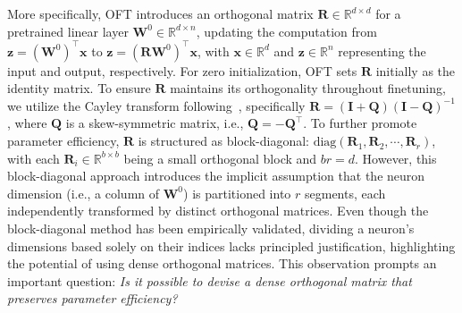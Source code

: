More specifically, OFT introduces an orthogonal matrix $\bm{R}\in\mathbb{R}^{d\times d}$ for a pretrained linear layer $\bm{W}^0\in\mathbb{R}^{d\times n}$, updating the computation from $\bm{z}=(\bm{W}^0)^\top\bm{x}$ to $\bm{z}=(\bm{R}\bm{W}^0)^\top\bm{x}$, with $\bm{x}\in\mathbb{R}^{d}$ and $\bm{z}\in\mathbb{R}^{n}$ representing the input and output, respectively. For zero initialization, OFT sets $\bm{R}$ initially as the identity matrix. To ensure $\bm{R}$ maintains its orthogonality throughout finetuning, we utilize the Cayley transform following~\cite{qiu2023controlling,liu2021orthogonal}, specifically $\bm{R}=(\bm{I}+\bm{Q})(\bm{I}-\bm{Q})^{-1}$, where $\bm{Q}$ is a skew-symmetric matrix, i.e., $\bm{Q}=-\bm{Q}^\top$. To further promote parameter efficiency, $\bm{R}$ is structured as block-diagonal: $\text{diag}(\bm{R}_1,\bm{R}_2,\cdots,\bm{R}_r)$, with each $\bm{R}_i\in\mathbb{R}^{b\times b}$ being a small orthogonal block and $br=d$. However, this block-diagonal approach introduces the implicit assumption that the neuron dimension (i.e., a column of $\bm{W}^0$) is partitioned into $r$ segments, each independently transformed by distinct orthogonal matrices. Even though the block-diagonal method has been empirically validated, dividing a neuron’s dimensions based solely on their indices lacks principled justification, highlighting the potential of using dense orthogonal matrices. This observation prompts an important question: \emph{Is it possible to devise a dense orthogonal matrix that preserves parameter efficiency?}

